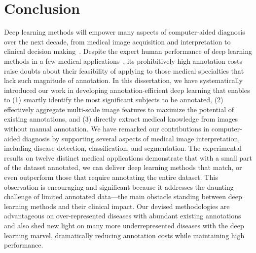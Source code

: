 \chapter{Conclusion}
\label{ch7}


Deep learning methods will empower many aspects of computer-aided diagnosis over the next decade, from medical image acquisition and interpretation to clinical decision making~\citep{esteva2019guide,zhou2021review}. Despite the expert human performance of deep learning methods in a few medical applications~\citep{gulshan2016development,esteva2017dermatologist,ardila2019end,mckinney2020international}, its prohibitively high annotation costs raise doubts about their feasibility of applying to those medical specialties that lack such magnitude of annotation. In this dissertation, we have systematically introduced our work in developing annotation-efficient deep learning that enables to (1) smartly identify the most significant subjects to be annotated, (2) effectively aggregate multi-scale image features to maximize the potential of existing annotations, and (3) directly extract medical knowledge from images without manual annotation. We have remarked our contributions in computer-aided diagnosis by supporting several aspects of medical image interpretation, including disease detection, classification, and segmentation. The experimental results on twelve distinct medical applications demonstrate that with a small part of the dataset annotated, we can deliver deep learning methods that match, or even outperform those that require annotating the entire dataset. This observation is encouraging and significant because it addresses the daunting challenge of limited annotated data---the main obstacle standing between deep learning methods and their clinical impact. Our devised methodologies are advantageous on over-represented diseases with abundant existing annotations and also shed new light on many more underrepresented diseases with the deep learning marvel, dramatically reducing annotation costs while maintaining high performance.

